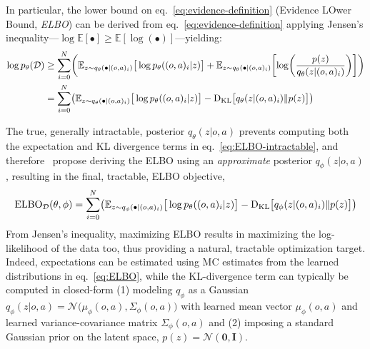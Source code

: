 In particular, the lower bound on eq.~\ref{eq:evidence-definition} (Evidence LOwer Bound, \emph{ELBO}) can be derived from eq.~\ref{eq:evidence-definition} applying Jensen's inequality---\(\log \mathbb{E}[\bullet] \geq \mathbb{E} [\log (\bullet)] \)---yielding:
\begin{align}
    \log p_\theta(\mathcal D) &\geq \sum_{i=0}^{N} \left(
            \mathbb{E}_{z \sim q_\theta(\bullet \vert (o,a)_i)} \big[ \log p_\theta((o,a)_i \vert z) \big]
            + \mathbb{E}_{z \sim q_\theta(\bullet \vert (o,a)_i)} \left[ \log \left( \frac{p(z)}{q_\theta(z \vert (o,a)_i)} \right) \right]
        \right) \\
        &= \sum_{i=0}^{N} \left(
            \mathbb{E}_{z \sim q_\theta(\bullet \vert (o,a)_i)} \big[ \log p_\theta((o,a)_i \vert z) \big]
        - \DKL \big[ q_\theta(z \vert (o,a)_i) \Vert p(z) \big]
        \right) \label{eq:ELBO-intractable}
\end{align}

The true, generally intractable, posterior \( q_\theta (z \vert o,a) \) prevents computing both the expectation and KL divergence terms in eq.~\ref{eq:ELBO-intractable}, and therefore~\citet{kingma2013auto} propose deriving the ELBO using an \emph{approximate} posterior \( q_\phi(z \vert o,a) \), resulting in the final, tractable, ELBO objective,
\begin{align}
\text{ELBO}_{\mathcal D}(\theta, \phi) = \sum_{i=0}^{N} \left(
            \mathbb{E}_{z \sim q_\phi(\bullet \vert (o,a)_i)} \big[ \log p_\theta((o,a)_i \vert z) \big]
        - \DKL \big[ q_\phi(z \vert (o,a)_i) \Vert p(z) \big]
        \right)
        \label{eq:ELBO}
\end{align}
From Jensen's inequality, maximizing ELBO results in maximizing the log-likelihood of the data too, thus providing a natural, tractable optimization target.
Indeed, expectations can be estimated using MC estimates from the learned distributions in eq.~\ref{eq:ELBO}, while the KL-divergence term can typically be computed in closed-form (1) modeling  \(q_\phi \) as a Gaussian \(q_\phi(z \vert o,a) = \mathcal N\big(\mu_\phi(o,a), \Sigma_\phi(o,a) \big) \) with learned mean vector \( \mu_\phi(o,a) \) and learned variance-covariance matrix \( \Sigma_\phi(o,a) \) and (2) imposing a standard Gaussian prior on the latent space, \( p(z) = \mathcal N(\mathbf{0}, \mathbf{I}) \).

